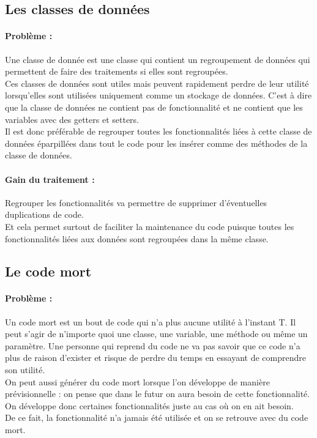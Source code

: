 \documentclass[a4paper,twoside,12pt,openright]{report}
\begin{document}
\subsection{Les classes de données}
\paragraph{Problème :}
Une classe de donnée est une classe qui contient un regroupement de données qui permettent de faire des traitements si elles sont regroupées.\\
Ces classes de données sont utiles mais peuvent rapidement perdre de leur utilité lorsqu'elles sont utilisées uniquement comme un stockage de données. C'est à dire que la classe de données ne contient pas de fonctionnalité et ne contient que les variables avec des getters et setters.\\
Il est donc préférable de regrouper toutes les fonctionnalités liées à cette classe de données éparpillées dans tout le code pour les insérer comme des méthodes de la classe de données.\\ 

\paragraph{Gain du traitement :}
Regrouper les fonctionnalités va permettre de supprimer d'éventuelles  duplications de code.\\
Et cela permet surtout de faciliter la maintenance du code puisque toutes les fonctionnalités liées aux données sont regroupées dans la même classe.\\

\subsection{Le code mort}
\paragraph{Problème :}
Un code mort est un bout de code qui n'a plus aucune utilité à l'instant T. Il peut s'agir de n'importe quoi une classe, une variable, une méthode ou même un paramètre.
Une personne qui reprend du code ne va pas savoir que ce code n'a plus de raison d'exister et risque de perdre du temps en essayant de comprendre son utilité.\\

On peut aussi générer du code mort lorsque l'on développe de manière prévisionnelle : on pense que dans le futur on aura besoin de cette fonctionnalité.
On développe donc certaines fonctionnalités juste au cas où on en ait besoin.\\
De ce fait, la fonctionnalité n'a jamais été utilisée et on se retrouve avec du code mort.\\
\end{document}

